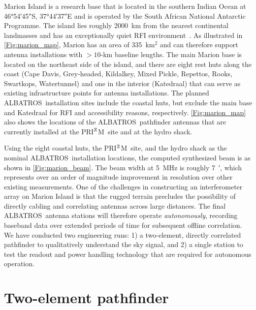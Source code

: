\documentclass{ws-jai}
\def\albatros{ALBATROS}
\def\prizm{PRI$^{\rm Z}$M}
\begin{document}
Marion Island is a research base that is located in the southern
Indian Ocean at \ang{46;54;45}S, \ang{37;44;37}E and is operated by
the South African National Antarctic Programme.  The island lies
roughly \SI{2000}{\kilo\metre} from the nearest continental landmasses
and has an exceptionally quiet RFI
environment~\citep{2019JAI.....850004P}.  As illustrated in
\autoref{Fig:marion_map}, Marion has an area of 335~km$^2$ and can
therefore support antenna installations with $>10$-km baseline
lengths.  The main Marion base is located on the northeast side of the
island, and there are eight rest huts along the coast (Cape Davis,
Grey-headed, Kildalkey, Mixed Pickle, Repettos, Rooks, Swartkops,
Watertunnel) and one in the interior (Katedraal) that can serve as
existing infrastructure points for antenna installations.  The planned
\albatros\ installation sites include the coastal huts, but exclude
the main base and Katedraal for RFI and accessibility reasons,
respectively.  \autoref{Fig:marion_map} also shows the locations of
the \albatros\ pathfinder antennas that are currently installed at the
\prizm\ site and at the hydro shack.

Using the eight coastal huts, the \prizm\ site, and the hydro shack as
the nominal \albatros\ installation locations, the computed
synthesized beam is as shown in \autoref{Fig:marion_beam}.  The beam
width at 5~MHz is roughly \SI{7}{\arcminute}, which represents over an
order of magnitude improvement in resolution over other existing
measurements.  One of the challenges in constructing an interferometer
array on Marion Island is that the rugged terrain precludes the
possibility of directly cabling and correlating antennas across large
distances.  The final \albatros\ antenna stations will therefore
operate {\it autonomously}, recording baseband data over extended
periods of time for subsequent offline correlation.  We have conducted
two engineering runs: 1) a two-element, directly correlated pathfinder
to qualitatively understand the sky signal, and 2) a single station to
test the readout and power handling technology that are required for
autonomous operation.

\section{Two-element pathfinder}
\end{document}
